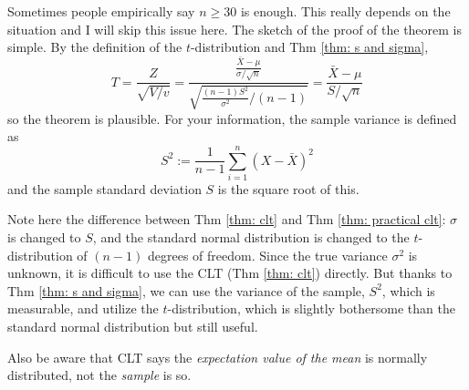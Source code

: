 Sometimes people empirically say $ n \ge 30 $ is enough. This really depends on the situation and I will skip this issue here. The sketch of the proof of the theorem is simple. By the definition of the $ t $-distribution and Thm \ref{thm: s and sigma}, 
\begin{equation}
  T = \frac{Z}{\sqrt{V /v}} = \frac{ \frac{\bar{X} - \mu}{\sigma / \sqrt{n}} }
  {\sqrt{ \frac{(n - 1) S^2}{\sigma^2 } / (n-1)}}
  = \frac{\bar{X} - \mu}{S / \sqrt{{n}}}
\end{equation}
so the theorem is plausible. For your information, the sample variance is defined as
\begin{equation}
  S^2 := \frac{1}{n - 1} \sum_{i=1}^{n} (X - \bar{X})^2 
\end{equation}
and the sample standard deviation $ S $ is the square root of this.

Note here the difference between Thm \ref{thm: clt} and Thm \ref{thm: practical clt}: $ \sigma $ is changed to $ S $, and the standard normal distribution is changed to the $ t $-distribution of $ (n - 1) $ degrees of freedom. Since the true variance $ \sigma^2 $ is unknown, it is difficult to use the CLT (Thm \ref{thm: clt}) directly. But thanks to Thm \ref{thm: s and sigma}, we can use the variance of the sample, $ S^2 $, which is measurable, and utilize the $ t $-distribution, which is slightly bothersome than the standard normal distribution but still useful. 

Also be aware that CLT says the \textit{expectation value of the mean} is normally distributed, not the \textit{sample} is so.

